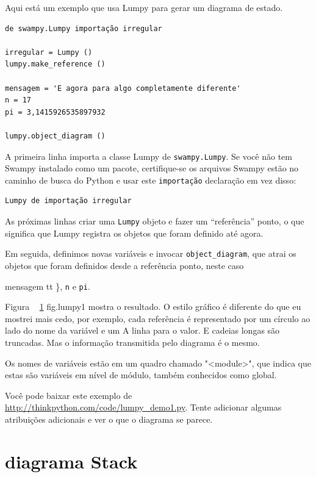 \documentclass[10pt]{book}
\begin{document}
\begin{exercise}
\begin{v erbatim}
Aqui está um exemplo que usa Lumpy para gerar um diagrama de estado.
 

\begin{verbatim}
de swampy.Lumpy importação irregular

irregular = Lumpy ()
lumpy.make_reference ()

mensagem = 'E agora para algo completamente diferente'
n = 17
pi = 3,1415926535897932

lumpy.object_diagram ()
\end{verbatim}

A primeira linha importa a classe Lumpy de {\tt swampy.Lumpy}.
Se você não tem Swampy instalado como um pacote, certifique-se
os arquivos Swampy estão no caminho de busca do Python e usar este
{\tt importação} declaração em vez disso:

\begin{verbatim}
Lumpy de importação irregular
\end{verbatim}

As próximas linhas criar uma {\tt Lumpy} objeto e fazer um ``referência''
ponto, o que significa que Lumpy registra os objetos que foram
definido até agora.

Em seguida, definimos novas variáveis ​​e invocar \verb "object_diagram",
que atrai os objetos que foram definidos desde a referência
ponto, neste caso {mensagem tt \}, {\tt n} e {\tt pi}.

Figura ~ \ref {} fig.lumpy1 mostra o resultado. O estilo gráfico é
diferente do que eu mostrei mais cedo, por exemplo, cada
referência é representado por um círculo ao lado do nome da variável e um
A linha para o valor. E cadeias longas são truncadas. Mas o
informação transmitida pelo diagrama é o mesmo.

Os nomes de variáveis ​​estão em um quadro chamado \verbo "<module>", que
indica que estas são variáveis ​​em nível de módulo, também conhecidos como
global.

Você pode baixar este exemplo de
\url{http://thinkpython.com/code/lumpy_demo1.py}. Tente adicionar algumas
atribuições adicionais e ver o que o diagrama se parece.


\section{diagrama Stack}

}
\end{v erbatim}
\end{exercise}
\end{document}
